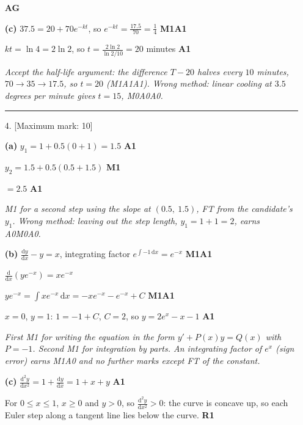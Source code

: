 \documentclass[12pt, twoside]{article}
\begin{document}
\begin{enumerate}[itemsep=0.3cm]
\hfill \textbf{AG}

\textbf{(c)} $37.5 = 20 + 70e^{-kt}$, so $e^{-kt} = \frac{17.5}{70} = \frac{1}{4}$
\hfill \textbf{M1A1}

$kt = \ln 4 = 2\ln 2$, so $t = \frac{2\ln 2}{\ln 2 / 10} = 20$ minutes
\hfill \textbf{A1}

\emph{Accept the half-life argument: the difference $T - 20$ halves every
$10$ minutes, $70 \to 35 \to 17.5$, so $t = 20$ (M1A1A1). Wrong method:
linear cooling at $3.5$ degrees per minute gives $t = 15$, M0A0A0.}

\bigskip \hrule \bigskip

\item[4.] [Maximum mark: 10]

\textbf{(a)} $y_{1} = 1 + 0.5(0 + 1) = 1.5$ \hfill \textbf{A1}

$y_{2} = 1.5 + 0.5(0.5 + 1.5)$ \hfill \textbf{M1}

$= 2.5$ \hfill \textbf{A1}

\emph{M1 for a second step using the slope at $(0.5,\ 1.5)$, FT from the
candidate's $y_{1}$. Wrong method: leaving out the step length,
$y_{1} = 1 + 1 = 2$, earns A0M0A0.}

\textbf{(b)} $\frac{\mathrm{d}y}{\mathrm{d}x} - y = x$, integrating factor
$e^{\int -1\,\mathrm{d}x} = e^{-x}$ \hfill \textbf{M1A1}

$\frac{\mathrm{d}}{\mathrm{d}x}\left(ye^{-x}\right) = xe^{-x}$

$ye^{-x} = \int xe^{-x}\,\mathrm{d}x = -xe^{-x} - e^{-x} + C$ \hfill \textbf{M1A1}

$x = 0$, $y = 1$: $1 = -1 + C$, $C = 2$, so $y = 2e^{x} - x - 1$ \hfill \textbf{A1}

\emph{First M1 for writing the equation in the form $y' + P(x)y = Q(x)$
with $P = -1$. Second M1 for integration by parts. An integrating factor
of $e^{x}$ (sign error) earns M1A0 and no further marks except FT of the
constant.}

\textbf{(c)} $\frac{\mathrm{d}^{2}y}{\mathrm{d}x^{2}} = 1 + \frac{\mathrm{d}y}{\mathrm{d}x} = 1 + x + y$
\hfill \textbf{A1}

For $0 \le x \le 1$, $x \ge 0$ and $y > 0$, so
$\frac{\mathrm{d}^{2}y}{\mathrm{d}x^{2}} > 0$: the curve is concave up, so
each Euler step along a tangent line lies below the curve. \hfill \textbf{R1}


\end{enumerate}
\end{document}
